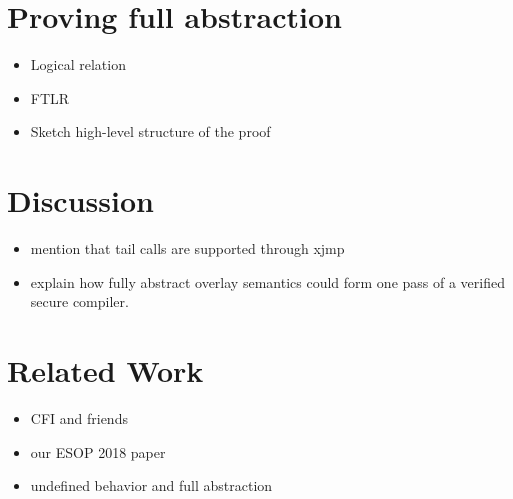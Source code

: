 \documentclass[acmsmall,review,anonymous]{acmart}\settopmatter{printfolios=true,printccs=false,printacmref=false}
\begin{document}
\section{Proving full abstraction}
\label{sec:fa-proof}

\begin{itemize}
\item Logical relation
\item FTLR
\item Sketch high-level structure of the proof
\end{itemize}

\section{Discussion}
\begin{itemize}
\item mention that tail calls are supported through xjmp
\item explain how fully abstract overlay semantics could form one pass of a verified secure compiler.
\end{itemize}
\section{Related Work}
\begin{itemize}
\item CFI and friends
\item our ESOP 2018 paper \citep{skorstengaard_reasoning_2017}
\item undefined behavior and full abstraction \citep{juglaret_beyond_2016}
\end{itemize}




\end{document}
